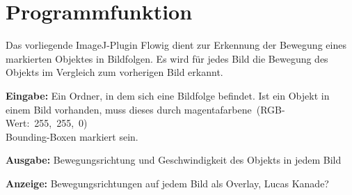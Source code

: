 
\chapter{Programmfunktion}\label{sec:Einleitung}
Das vorliegende ImageJ-Plugin Flowig dient zur Erkennung der Bewegung eines markierten Objektes in Bildfolgen. Es wird für jedes Bild die Bewegung des Objekts im Vergleich zum vorherigen Bild erkannt.

\textbf{Eingabe: } Ein Ordner, in dem sich eine Bildfolge befindet. Ist ein Objekt in einem Bild vorhanden, muss dieses durch magentafarbene~(RGB-Wert:~255,~255,~0)\\Bounding-Boxen markiert sein.


\textbf{Ausgabe: } Bewegungsrichtung und Geschwindigkeit des Objekts in jedem Bild


\textbf{Anzeige: } Bewegungsrichtungen auf jedem Bild als Overlay, Lucas Kanade?

